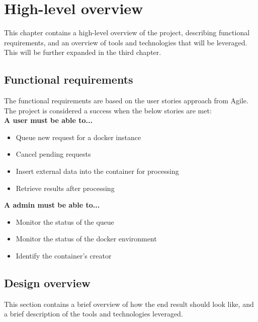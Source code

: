 \documentclass[../main.tex]{subfiles}
\begin{document}
\renewcommand{\baselinestretch}{1.5}

\chapter{High-level overview}
This chapter contains a high-level overview of the project, describing functional requirements, and an overview of tools and technologies that will be leveraged. This will be further expanded in the third chapter.

\section{Functional requirements}
The functional requirements are based on the user stories approach from Agile. The project is considered a success when the below stories are met:\\

\textbf{A user must be able to...}
\begin{itemize}
    \item Queue new request for a docker instance
    \item Cancel pending requests
    \item Insert external data into the container for processing
    \item Retrieve results after processing
\end{itemize}


\textbf{A admin must be able to...}
\begin{itemize}
    \item Monitor the status of the queue
    \item Monitor the status of the docker environment
    \item Identify the container's creator
\end{itemize}


\section{Design overview}
This section contains a brief overview of how the end result should look like, and a brief description of the tools and technologies leveraged.
\end{document}
